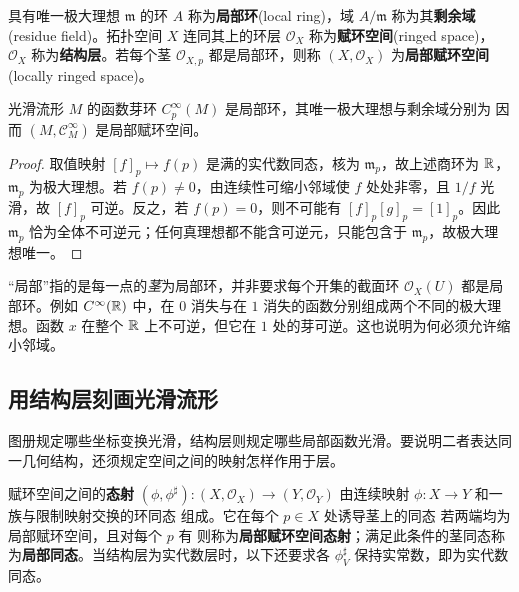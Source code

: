 \begin{definition}\label{def:locally-ringed-space}
    具有唯一极大理想 $\mathfrak m$ 的环 $A$ 称为\textbf{局部环}(local ring)，域 $A/\mathfrak m$ 称为其\textbf{剩余域}(residue field)。拓扑空间 $X$ 连同其上的环层 $\mathcal O_X$ 称为\textbf{赋环空间}(ringed space)，$\mathcal O_X$ 称为\textbf{结构层}。若每个茎 $\mathcal O_{X,p}$ 都是局部环，则称 $(X,\mathcal O_X)$ 为\textbf{局部赋环空间}(locally ringed space)。
\end{definition}

\begin{proposition}\label{prop:smooth-local-ring}
    光滑流形 $M$ 的函数芽环 $C^\infty_p(M)$ 是局部环，其唯一极大理想与剩余域分别为
    因而 $(M,\mathcal C^\infty_M)$ 是局部赋环空间。
\end{proposition}
\begin{proof}
    取值映射 $[f]_p\mapsto f(p)$ 是满的实代数同态，核为 $\mathfrak m_p$，故上述商环为 $\mathbb{R}$，$\mathfrak m_p$ 为极大理想。若 $f(p)\ne0$，由连续性可缩小邻域使 $f$ 处处非零，且 $1/f$ 光滑，故 $[f]_p$ 可逆。反之，若 $f(p)=0$，则不可能有 $[f]_p[g]_p=[1]_p$。因此 $\mathfrak m_p$ 恰为全体不可逆元；任何真理想都不能含可逆元，只能包含于 $\mathfrak m_p$，故极大理想唯一。
\end{proof}

\begin{remark}
    “局部”指的是每一点的\emph{茎}为局部环，并非要求每个开集的截面环 $\mathcal O_X(U)$ 都是局部环。例如 $C^\infty(\mathbb{R})$ 中，在 $0$ 消失与在 $1$ 消失的函数分别组成两个不同的极大理想。函数 $x$ 在整个 $\mathbb{R}$ 上不可逆，但它在 $1$ 处的芽可逆。这也说明为何必须允许缩小邻域。
\end{remark}

\subsection{用结构层刻画光滑流形}

图册规定哪些坐标变换光滑，结构层则规定哪些局部函数光滑。要说明二者表达同一几何结构，还须规定空间之间的映射怎样作用于层。

\begin{definition}\label{def:locally-ringed-morphism}
    赋环空间之间的\textbf{态射} $(\phi,\phi^\sharp):(X,\mathcal O_X)\to(Y,\mathcal O_Y)$ 由连续映射 $\phi:X\to Y$ 和一族与限制映射交换的环同态
    组成。它在每个 $p\in X$ 处诱导茎上的同态
    若两端均为局部赋环空间，且对每个 $p$ 有
    则称为\textbf{局部赋环空间态射}；满足此条件的茎同态称为\textbf{局部同态}。当结构层为实代数层时，以下还要求各 $\phi^\sharp_V$ 保持实常数，即为实代数同态。
\end{definition}

